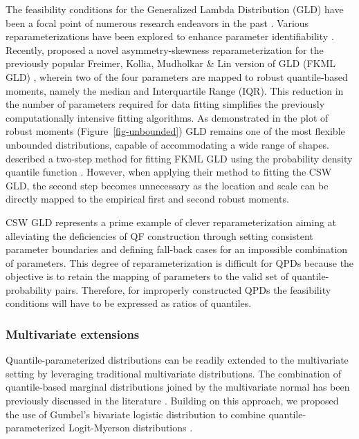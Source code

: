 \documentclass[
  fleqn,
  deca,
  blindrev
]{informs4}
\begin{document}
The feasibility conditions for the Generalized Lambda Distribution (GLD)
have been a focal point of numerous research endeavors in the past
\citep[etc]{dean2013ImprovedEstimationRegression, fournier2007EstimatingParametersGeneralized, karian2019FittingStatisticalDistributions, king2007FittingGeneralizedLambda, tarsitano2005EstimationGeneralizedLambda}.
Various reparameterizations have been explored to enhance parameter
identifiability \citep{ramberg1974ApproximateMethodGenerating}.
Recently, \citep{chalabi2012FlexibleDistributionModeling} proposed a
novel asymmetry-skewness reparameterization for the previously popular
Freimer, Kollia, Mudholkar \& Lin version of GLD (FKML GLD)
\citep{freimer1988StudyGeneralizedTukey}, wherein two of the four
parameters are mapped to robust quantile-based moments, namely the
median and Interquartile Range (IQR). This reduction in the number of
parameters required for data fitting simplifies the previously
computationally intensive fitting algorithms. As demonstrated in the
plot of robust moments (Figure~\ref{fig-unbounded}) GLD remains one of
the most flexible unbounded distributions, capable of accommodating a
wide range of shapes.
\citep{dedduwakumara2021EfficientEstimatorParameters} described a
two-step method for fitting FKML GLD using the probability density
quantile function \citep{staudte2017ShapesThingsCome}. However, when
applying their method to fitting the CSW GLD, the second step becomes
unnecessary as the location and scale can be directly mapped to the
empirical first and second robust moments.

CSW GLD represents a prime example of clever reparameterization aiming
at alleviating the deficiencies of QF construction through setting
consistent parameter boundaries and defining fall-back cases for an
impossible combination of parameters. This degree of reparameterization
is difficult for QPDs because the objective is to retain the mapping of
parameters to the valid set of quantile-probability pairs. Therefore,
for improperly constructed QPDs the feasibility conditions will have to
be expressed as ratios of quantiles.

\subsubsection*{Multivariate extensions}\label{multivariate-extensions}

Quantile-parameterized distributions can be readily extended to the
multivariate setting by leveraging traditional multivariate
distributions. The combination of quantile-based marginal distributions
joined by the multivariate normal has been previously discussed in the
literature
\citep{drovandi2011LikelihoodfreeBayesianEstimation, hoff2007ExtendingRankLikelihood}.
Building on this approach, we proposed the use of Gumbel's bivariate
logistic distribution \citep{gumbel1961BivariateLogisticDistributions}
to combine quantile-parameterized Logit-Myerson distributions
\citep{wilson2023ReconciliationExpertPriors}.
\end{document}
